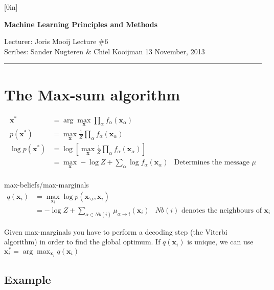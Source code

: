 \documentclass[11pt]{article}
\renewcommand{\vec}[1]{\boldsymbol{#1}}
\begin{document}
\thispagestyle{empty}

\raisebox{0.6in}[0in]{}
\vspace{-0.7in}

\begin{center}
\bf\large Machine Learning Principles and Methods
\end{center}

\noindent
Lecturer: Joris Mooij				  %
\hfill
Lecture \#6                            %
\\
Scribes: Sander Nugteren \& Chiel Kooijman  %
\hfill
13 November, 2013                        %

\noindent
\rule{\textwidth}{1pt}

\medskip


\section*{The Max-sum algorithm}
\begin{align*}
	\displaystyle
	\vec{x}^* &= \arg\max_{\vec{x}} \prod_\alpha f_\alpha (\vec{x}_\alpha)\\
	p(\vec{x}^*) &= \max_{\vec{x}} \frac{1}{Z} \prod_\alpha f_\alpha (\vec{x}_\alpha)\\
	\log p(\vec{x}^*) &= \log\left[\max_{\vec{x}} \frac{1}{Z} \prod_\alpha
			f_\alpha (\vec{x}_\alpha)\right]\\
	&= \max_{\vec{x}} -\log Z + \sum_\alpha \log f_\alpha (\vec{x}_\alpha)&
			\text{Determines the message $\mu$}\\
\end{align*}


max-beliefs/max-marginals
\begin{align*}
	\displaystyle
	q(\vec{x}_i) &= \max_{\vec{x}_i}
	\log p(\vec{x}_{\smallsetminus i}, \vec{x}_i)\\
				&= -\log Z +
	\sum_{\alpha \in \mathit{Nb}(i)} \mu_{\alpha \rightarrow i}(\vec{x}_i)
	& \text{$\mathit{Nb}(i)$ denotes the neighbours of $\vec{x}_i$}
\end{align*}

Given max-marginals you have to perform a decoding step (the Viterbi algorithm)
in order to find the global optimum. If $q(\vec{x}_i)$ is unique, we can use
$\vec{x}^*_i = \arg\max_{\vec{x}_i} q(\vec{x}_i)$

\subsection*{Example}
\end{document}
